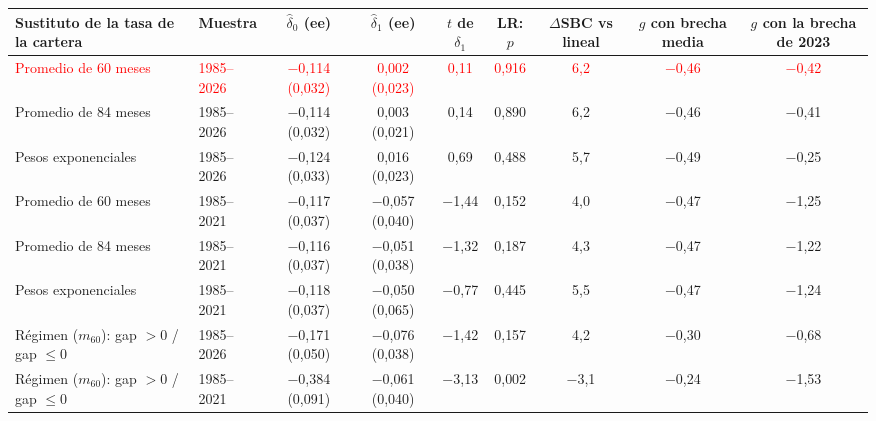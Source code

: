 \begin{tabular}{llccccccc}
\toprule
Sustituto de la tasa de la cartera & Muestra & $\hat\delta_0$ (ee) & $\hat\delta_1$ (ee) & $t$ de $\delta_1$ & LR: $p$ & $\Delta$SBC vs lineal & $g$ con brecha media & $g$ con la brecha de 2023
\\ \midrule
\textcolor{red}{Promedio de 60 meses} & \textcolor{red}{1985--2026} & \textcolor{red}{\ensuremath{-}0{,}114 (0{,}032)} & \textcolor{red}{0{,}002 (0{,}023)} & \textcolor{red}{0{,}11} & \textcolor{red}{0{,}916} & \textcolor{red}{6{,}2} & \textcolor{red}{\ensuremath{-}0{,}46} & \textcolor{red}{\ensuremath{-}0{,}42} \\
Promedio de 84 meses & 1985--2026 & \ensuremath{-}0{,}114 (0{,}032) & 0{,}003 (0{,}021) & 0{,}14 & 0{,}890 & 6{,}2 & \ensuremath{-}0{,}46 & \ensuremath{-}0{,}41 \\
Pesos exponenciales & 1985--2026 & \ensuremath{-}0{,}124 (0{,}033) & 0{,}016 (0{,}023) & 0{,}69 & 0{,}488 & 5{,}7 & \ensuremath{-}0{,}49 & \ensuremath{-}0{,}25 \\
Promedio de 60 meses & 1985--2021 & \ensuremath{-}0{,}117 (0{,}037) & \ensuremath{-}0{,}057 (0{,}040) & \ensuremath{-}1{,}44 & 0{,}152 & 4{,}0 & \ensuremath{-}0{,}47 & \ensuremath{-}1{,}25 \\
Promedio de 84 meses & 1985--2021 & \ensuremath{-}0{,}116 (0{,}037) & \ensuremath{-}0{,}051 (0{,}038) & \ensuremath{-}1{,}32 & 0{,}187 & 4{,}3 & \ensuremath{-}0{,}47 & \ensuremath{-}1{,}22 \\
Pesos exponenciales & 1985--2021 & \ensuremath{-}0{,}118 (0{,}037) & \ensuremath{-}0{,}050 (0{,}065) & \ensuremath{-}0{,}77 & 0{,}445 & 5{,}5 & \ensuremath{-}0{,}47 & \ensuremath{-}1{,}24 \\
R\'egimen ($m_{60}$): gap $>0$ / gap $\leq 0$ & 1985--2026 & \ensuremath{-}0{,}171 (0{,}050) & \ensuremath{-}0{,}076 (0{,}038) & \ensuremath{-}1{,}42 & 0{,}157 & 4{,}2 & \ensuremath{-}0{,}30 & \ensuremath{-}0{,}68 \\
R\'egimen ($m_{60}$): gap $>0$ / gap $\leq 0$ & 1985--2021 & \ensuremath{-}0{,}384 (0{,}091) & \ensuremath{-}0{,}061 (0{,}040) & \ensuremath{-}3{,}13 & 0{,}002 & \ensuremath{-}3{,}1 & \ensuremath{-}0{,}24 & \ensuremath{-}1{,}53 \\
\bottomrule
\end{tabular}
